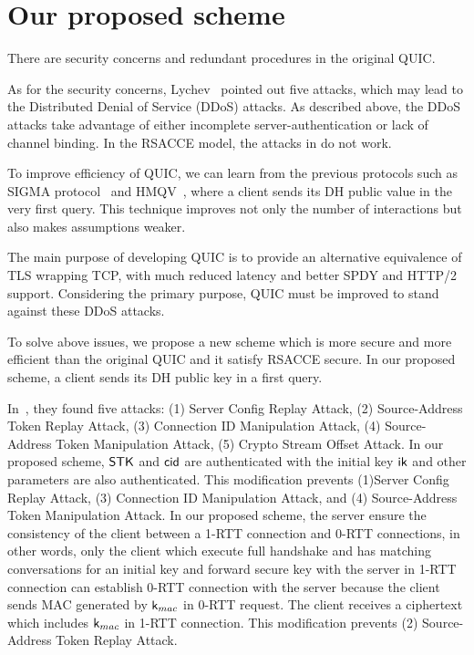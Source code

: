 \section{Our proposed scheme} \label{sec:proposed_scheme}

There are security concerns and redundant procedures in the original
QUIC.

As for the security concerns,
Lychev~\cite{LJBN15:QUIC} pointed out five attacks,
which may lead to the Distributed Denial of Service (DDoS) attacks.
As described above,
the DDoS attacks take advantage of either incomplete server-authentication or
lack of channel binding.
In the RSACCE model, the attacks in \cite{LJBN15:QUIC} do not work.

To improve efficiency of QUIC, we can learn from
the previous protocols such as SIGMA protocol~\cite{Kra03:SIGMA} and HMQV~\cite{Kra05:HQMV},
where a client sends its DH public value in the very first query.
This technique improves not only the number of interactions
but also makes assumptions weaker.

The main purpose of developing QUIC is to provide an
alternative equivalence of TLS wrapping TCP, with much
reduced latency and better SPDY and HTTP/2 support.
Considering the primary purpose, QUIC must be improved to stand against these DDoS attacks.
\fi

To solve above issues, we propose a new scheme which is more secure and more efficient
than the original QUIC and it satisfy RSACCE secure.
In our proposed scheme, a client sends its DH public key in
a first query.
\fi

In~\cite{LJBN15:QUIC}, they found five attacks:
(1) Server Config Replay Attack,
(2) Source-Address Token Replay Attack,
(3) Connection ID Manipulation Attack,
(4) Source-Address Token Manipulation Attack,
(5) Crypto Stream Offset Attack.
In our proposed scheme, $\mathsf{STK}$ and $\mathsf{cid}$ are authenticated with the initial key
$\mathsf{ik}$ and other parameters are also authenticated.
This modification prevents (1)Server Config Replay Attack,
(3) Connection ID Manipulation Attack, and
(4) Source-Address Token Manipulation Attack.
In our proposed scheme, the server ensure the consistency of the client between
a 1-RTT connection and 0-RTT connections, in other words, only the client which
execute full handshake and has matching conversations for an initial key and forward
secure key with the server in 1-RTT connection can establish 0-RTT connection with
the server because the client sends MAC generated by $\mathsf{k}_{mac}$ in 0-RTT request.
The client receives a ciphertext which includes $\mathsf{k}_{mac}$ in 1-RTT connection.
This modification prevents (2) Source-Address Token Replay Attack.
\fi
